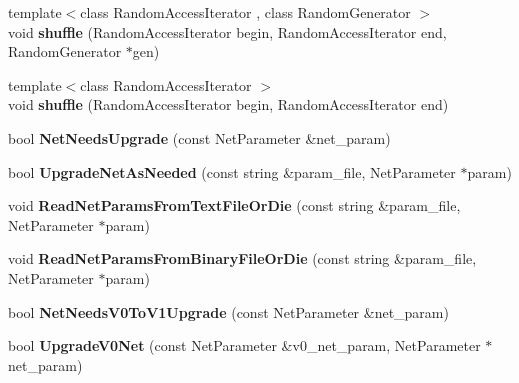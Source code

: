 \begin{DoxyCompactItemize}
\item 
{\footnotesize template$<$class Random\+Access\+Iterator , class Random\+Generator $>$ }\\void {\bfseries shuffle} (Random\+Access\+Iterator begin, Random\+Access\+Iterator end, Random\+Generator $\ast$gen)\hypertarget{namespacecaffe_ac095caaa74b68027f26b778e16146256}{}\label{namespacecaffe_ac095caaa74b68027f26b778e16146256}

\item 
{\footnotesize template$<$class Random\+Access\+Iterator $>$ }\\void {\bfseries shuffle} (Random\+Access\+Iterator begin, Random\+Access\+Iterator end)\hypertarget{namespacecaffe_a05b58af6ace88bd31e4ecc5a1d9b31d1}{}\label{namespacecaffe_a05b58af6ace88bd31e4ecc5a1d9b31d1}

\item 
bool {\bfseries Net\+Needs\+Upgrade} (const Net\+Parameter \&net\+\_\+param)\hypertarget{namespacecaffe_a83f79549cfd215fa6b8dc19ef3cc17f8}{}\label{namespacecaffe_a83f79549cfd215fa6b8dc19ef3cc17f8}

\item 
bool {\bfseries Upgrade\+Net\+As\+Needed} (const string \&param\+\_\+file, Net\+Parameter $\ast$param)\hypertarget{namespacecaffe_a1267415c684b414ca65f4832624d869b}{}\label{namespacecaffe_a1267415c684b414ca65f4832624d869b}

\item 
void {\bfseries Read\+Net\+Params\+From\+Text\+File\+Or\+Die} (const string \&param\+\_\+file, Net\+Parameter $\ast$param)\hypertarget{namespacecaffe_a8801bcd5125b2aec799adcc7f617be1a}{}\label{namespacecaffe_a8801bcd5125b2aec799adcc7f617be1a}

\item 
void {\bfseries Read\+Net\+Params\+From\+Binary\+File\+Or\+Die} (const string \&param\+\_\+file, Net\+Parameter $\ast$param)\hypertarget{namespacecaffe_aec4379a5d972592245df191bec9c75bd}{}\label{namespacecaffe_aec4379a5d972592245df191bec9c75bd}

\item 
bool {\bfseries Net\+Needs\+V0\+To\+V1\+Upgrade} (const Net\+Parameter \&net\+\_\+param)\hypertarget{namespacecaffe_a5ae89f37ec932cd9be668a9fe34af02b}{}\label{namespacecaffe_a5ae89f37ec932cd9be668a9fe34af02b}

\item 
bool {\bfseries Upgrade\+V0\+Net} (const Net\+Parameter \&v0\+\_\+net\+\_\+param, Net\+Parameter $\ast$net\+\_\+param)\hypertarget{namespacecaffe_ad3e2b3df000292ddccf6d2cd8b0af2a4}{}\label{namespacecaffe_ad3e2b3df000292ddccf6d2cd8b0af2a4}


\end{DoxyCompactItemize}
